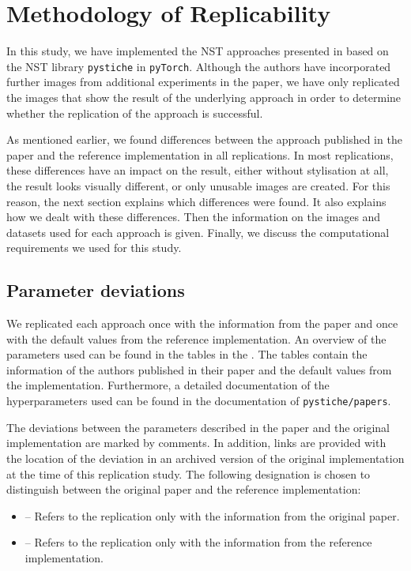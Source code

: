 \section{Methodology of Replicability}
In this study, we have implemented the \gls{NST} approaches presented in  based on the \gls{NST} library \texttt{pystiche} \cite{ML2020} in \texttt{pyTorch}. Although the authors have incorporated further images from additional experiments in the paper, we have only replicated the images that show the result of the underlying approach in order to determine whether the replication of the approach is successful. 

As mentioned earlier, we found differences between the approach published in the paper and the reference implementation in all replications. In most replications, these differences have an impact on the result, either without stylisation at all, the result looks visually different, or only unusable images are created. For this reason, the next section explains which differences were found. It also explains how we dealt with these differences. Then the information on the images and datasets used for each approach is given. Finally, we discuss the computational requirements we used for this study. 

\subsection{Parameter deviations} \label{sec:replicability}
We replicated each approach once with the information from the paper and once with the default values from the reference implementation. An overview of the parameters used can be found in the tables in the . The tables contain the information of the authors published in their paper and the default values from the implementation. Furthermore, a detailed documentation of the hyperparameters used can be found in the documentation of \texttt{pystiche/papers}. 

The deviations between the parameters described in the paper and the original implementation are marked by comments. In addition, links are provided with the location of the deviation in an archived version of the original implementation at the time of this replication study. The following designation is chosen to distinguish between the original paper and the reference implementation: 
\begin{itemize}
	\item \paper{} -- Refers to the replication only with the information from the original paper. 
	\item \implementation{} -- Refers to the replication only with the information from the reference implementation. 
\end{itemize}

